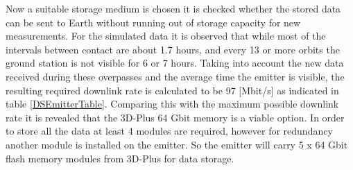Now a suitable storage medium is chosen it is checked whether the stored data can be sent to Earth without running out of storage capacity for new measurements. For the simulated data it is observed that while most of the intervals between contact are about 1.7 hours, and every 13 or more orbits the ground station is not visible for 6 or 7 hours. Taking into account the new data received during these overpasses and the average time the emitter is visible, the resulting required downlink rate is calculated to be 97 [Mbit/s] as indicated in table \ref{DSEmitterTable}. Comparing this with the maximum possible downlink rate it is revealed that the 3D-Plus 64 Gbit memory is a viable option. In order to store all the data at least 4 modules are required, however for redundancy another module is installed on the emitter. So the emitter will carry 5 x 64 Gbit flash memory modules from 3D-Plus for data storage.